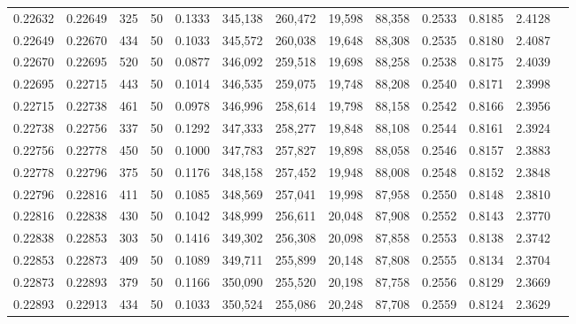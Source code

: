 \begin{tabular}{rrrrrrrrrrrrr}
0.22632 & 0.22649 &   325 &  50 &                                     0.1333 & 345,138 & 260,472 &  19,598 &  88,358 & 0.2533 & 0.8185 & 2.4128 \\
0.22649 & 0.22670 &   434 &  50 &                                     0.1033 & 345,572 & 260,038 &  19,648 &  88,308 & 0.2535 & 0.8180 & 2.4087 \\
0.22670 & 0.22695 &   520 &  50 &                                     0.0877 & 346,092 & 259,518 &  19,698 &  88,258 & 0.2538 & 0.8175 & 2.4039 \\
0.22695 & 0.22715 &   443 &  50 &                                     0.1014 & 346,535 & 259,075 &  19,748 &  88,208 & 0.2540 & 0.8171 & 2.3998 \\
0.22715 & 0.22738 &   461 &  50 &                                     0.0978 & 346,996 & 258,614 &  19,798 &  88,158 & 0.2542 & 0.8166 & 2.3956 \\
0.22738 & 0.22756 &   337 &  50 &                                     0.1292 & 347,333 & 258,277 &  19,848 &  88,108 & 0.2544 & 0.8161 & 2.3924 \\
0.22756 & 0.22778 &   450 &  50 &                                     0.1000 & 347,783 & 257,827 &  19,898 &  88,058 & 0.2546 & 0.8157 & 2.3883 \\
0.22778 & 0.22796 &   375 &  50 &                                     0.1176 & 348,158 & 257,452 &  19,948 &  88,008 & 0.2548 & 0.8152 & 2.3848 \\
0.22796 & 0.22816 &   411 &  50 &                                     0.1085 & 348,569 & 257,041 &  19,998 &  87,958 & 0.2550 & 0.8148 & 2.3810 \\
0.22816 & 0.22838 &   430 &  50 &                                     0.1042 & 348,999 & 256,611 &  20,048 &  87,908 & 0.2552 & 0.8143 & 2.3770 \\
0.22838 & 0.22853 &   303 &  50 &                                     0.1416 & 349,302 & 256,308 &  20,098 &  87,858 & 0.2553 & 0.8138 & 2.3742 \\
0.22853 & 0.22873 &   409 &  50 &                                     0.1089 & 349,711 & 255,899 &  20,148 &  87,808 & 0.2555 & 0.8134 & 2.3704 \\
0.22873 & 0.22893 &   379 &  50 &                                     0.1166 & 350,090 & 255,520 &  20,198 &  87,758 & 0.2556 & 0.8129 & 2.3669 \\
0.22893 & 0.22913 &   434 &  50 &                                     0.1033 & 350,524 & 255,086 &  20,248 &  87,708 & 0.2559 & 0.8124 & 2.3629 \\

\end{tabular}
